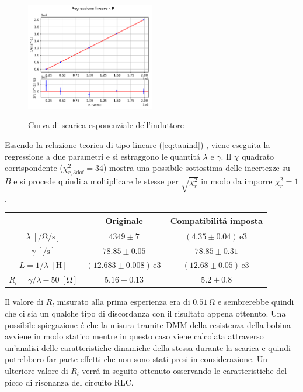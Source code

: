 \documentclass{article}
\newcommand{\E}[1]{\, \mathrm{e}{#1} \, }
\begin{document}
\begin{figure}[h]
	\centering
	\includegraphics[width=0.5\textwidth]{fig_tau2.pdf}
	\label{fig:fig_tau2}
	\caption{Curva di scarica esponenziale dell'induttore}
\end{figure}

Essendo la relazione teorica di tipo lineare (\ref{eq:tauind}) , viene eseguita la regressione a due parametri e si estraggono le quantit\'a $\lambda$ e $\gamma$. Il $\chi$ quadrato corrispondente ($\chi^2_{r,3 \mathrm{dof}}=34$) mostra una possibile sottostima delle incertezze su $B$ e si procede quindi a moltiplicare le stesse per $\sqrt{\chi^2_r}$ in modo da imporre $\chi^2_r=1$.

\begin{center}
\begin{tabular}{c | c c }
	& Originale & Compatibilit\'a imposta \\
	\hline
 $\lambda \ [\si{\per\ohm\per\second}]$ & $4349\pm 7$  & $ (4.35\pm 0.04)\E{3} $\\
 $\gamma \ [\si{\per\second}]$ & $78.85\pm 0.05$ & $78.85\pm 0.31 $ \\
 $L = 1/\lambda \ [\si{\henry}]$ & $ (12.683 \pm 0.008)\E{3} $ & $ (12.68\pm 0.05)\E{3} $ \\
 $R_l = \gamma/\lambda - 50 \ [\si{\ohm}]$ & $5.16\pm 0.13$ & $5.2\pm 0.8$ \\
\end{tabular}
\end{center}

Il valore di $R_l$ misurato alla prima esperienza era di $0.51 \ \si{\ohm}$ e sembrerebbe quindi che ci sia un qualche tipo di discordanza con il risultato appena ottenuto. Una possibile spiegazione \'e che la misura tramite DMM della resistenza della bobina avviene in modo statico mentre in questo caso viene calcolata attraverso un'analisi delle caratteristiche dinamiche della stessa durante la scarica e quindi potrebbero far parte effetti che non sono stati presi in considerazione. Un ulteriore valore di $R_l$ verr\'a in seguito ottenuto osservando le caratteristiche del picco di risonanza del circuito RLC.
\end{document}
